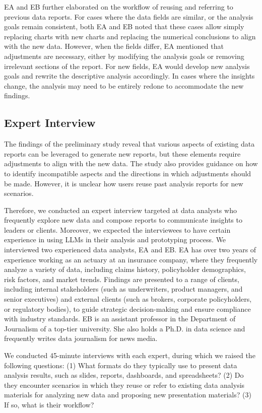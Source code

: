 EA and EB further elaborated on the workflow of reusing and referring to previous data reports. 
For cases where the data fields are similar, or the analysis goals remain consistent, both EA and EB noted that these cases allow simply replacing charts with new charts and replacing the numerical conclusions to align with the new data. 
However, when the fields differ, EA mentioned that adjustments are necessary, either by modifying the analysis goals or removing irrelevant sections of the report. 
For new fields, EA would develop new analysis goals and rewrite the descriptive analysis accordingly. In cases where the insights change, the analysis may need to be entirely redone to accommodate the new findings.

\subsection{Expert Interview}

The findings of the preliminary study reveal that various aspects of existing data reports can be leveraged to generate new reports, but these elements require adjustments to align with the new data. 
The study also provides guidance on how to identify incompatible aspects and the directions in which adjustments should be made. However, it is unclear how users reuse past analysis reports for new scenarios.

Therefore, we conducted an expert interview targeted at data analysts who frequently explore new data and compose reports to communicate insights to leaders or clients. Moreover, we expected the interviewees to have certain experience in using LLMs in their analysis and prototyping process.
We interviewed two experienced data analysts, EA and EB. 
EA has over two years of experience working as an actuary at an insurance company, where they frequently analyze a variety of data, including claims history, policyholder demographics, risk factors, and market trends.
Findings are presented to a range of clients, including internal stakeholders (such as underwriters, product managers, and senior executives) and external clients (such as brokers, corporate policyholders, or regulatory bodies), to guide strategic decision-making and ensure compliance with industry standards. 
EB is an assistant professor in the Department of Journalism of a top-tier university. She also holds a Ph.D. in data science and frequently writes data journalism for news media.


We conducted 45-minute interviews with each expert, during which we raised the following questions: (1) What formats do they typically use to present data analysis results, such as slides, reports, dashboards, and spreadsheets? (2) Do they encounter scenarios in which they reuse or refer to existing data analysis materials for analyzing new data and proposing new presentation materials? (3) If so, what is their workflow?

